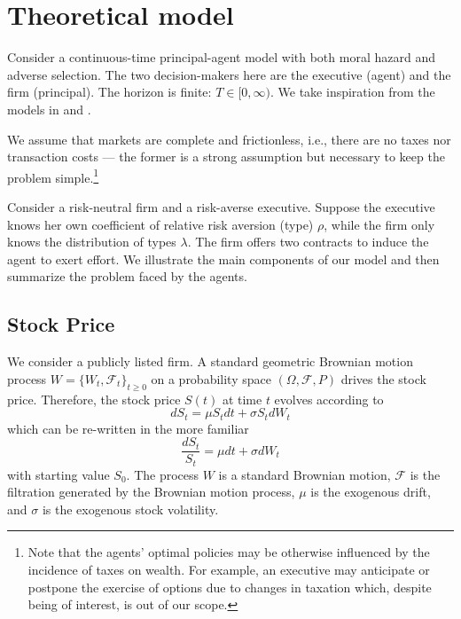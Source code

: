 \section{Theoretical model}

Consider a continuous-time principal-agent model with both moral hazard and adverse selection. The two decision-makers here are the executive (agent) and the firm (principal). The horizon is finite: $T \in [0, \infty)$.
We take inspiration from the models in \cite{sannikov2008continuous} and \cite{cadenillas2002executive}. 

We assume that markets are complete and frictionless, i.e., there are no taxes nor transaction costs --- the former is a strong assumption but necessary to keep the problem simple.\footnote{Note that the agents' optimal policies may be otherwise influenced by the incidence of taxes on wealth. For example, an executive may anticipate or postpone the exercise of options due to changes in taxation which, despite being of interest, is out of our scope.}

Consider a risk-neutral firm and a risk-averse executive. Suppose the executive knows her own coefficient of relative risk aversion (type) $\rho$, while the firm only knows the distribution of types $\lambda$. The firm offers two contracts to induce the agent to exert effort. We illustrate the main components of our model and then summarize the problem faced by the agents.


\subsection{Stock Price}
We consider a publicly listed firm. A standard geometric Brownian motion process $W = \{ W_t, \mathscr{F}_t \}_{t \ge 0}$ on a probability space $(\Omega, \mathscr{F}, P)$ drives the stock price. 
Therefore, the stock price $S(t)$ at time $t$ evolves according to 
$$ dS_t = \mu S_t dt + \sigma S_t dW_t $$
which can be re-written in the more familiar
$$ \frac{dS_t}{S_t} = \mu dt + \sigma dW_t $$
with starting value $S_0$. The process $W$ is a standard Brownian motion, $\mathscr{F}$ is the filtration generated by the Brownian motion process, $\mu$ is the exogenous drift, and $\sigma$ is the exogenous stock volatility. 

